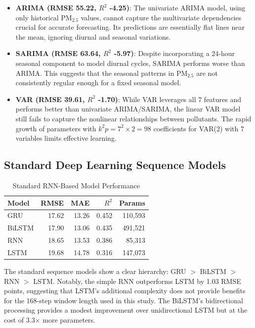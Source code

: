 \begin{itemize}
    \item \textbf{ARIMA (RMSE 55.22, $R^2$ -4.25)}: The univariate ARIMA model, using only historical PM$_{2.5}$ values, cannot capture the multivariate dependencies crucial for accurate forecasting. Its predictions are essentially flat lines near the mean, ignoring diurnal and seasonal variations.
    
    \item \textbf{SARIMA (RMSE 63.64, $R^2$ -5.97)}: Despite incorporating a 24-hour seasonal component to model diurnal cycles, SARIMA performs worse than ARIMA. This suggests that the seasonal patterns in PM$_{2.5}$ are not consistently regular enough for a fixed seasonal model.
    
    \item \textbf{VAR (RMSE 39.61, $R^2$ -1.70)}: While VAR leverages all 7 features and performs better than univariate ARIMA/SARIMA, the linear VAR model still fails to capture the nonlinear relationships between pollutants. The rapid growth of parameters with $k^2 p = 7^2 \times 2 = 98$ coefficients for VAR(2) with 7 variables limits effective learning.
\end{itemize}

\subsection{Standard Deep Learning Sequence Models}

\begin{table}[H]
\centering
\caption{Standard RNN-Based Model Performance}
\label{tab:rnn_family}
\begin{tabular}{lrrrr}
\toprule
\textbf{Model} & \textbf{RMSE} & \textbf{MAE} & \textbf{$R^2$} & \textbf{Params} \\
\midrule
GRU & 17.62 & 13.26 & 0.452 & 110,593 \\
BiLSTM & 17.90 & 13.06 & 0.435 & 491,521 \\
RNN & 18.65 & 13.53 & 0.386 & 85,313 \\
LSTM & 19.68 & 14.78 & 0.316 & 147,073 \\
\bottomrule
\end{tabular}
\end{table}

The standard sequence models show a clear hierarchy: GRU $>$ BiLSTM $>$ RNN $>$ LSTM. Notably, the simple RNN outperforms LSTM by 1.03 RMSE points, suggesting that LSTM's additional complexity does not provide benefits for the 168-step window length used in this study. The BiLSTM's bidirectional processing provides a modest improvement over unidirectional LSTM but at the cost of 3.3$\times$ more parameters.

